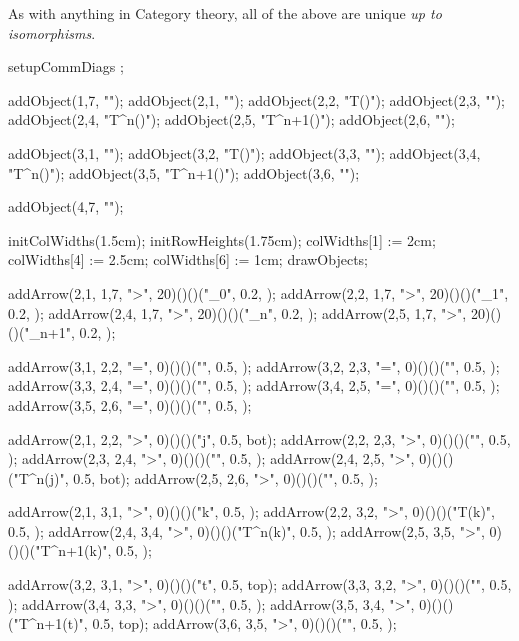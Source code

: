 \stopitemize

\noindent As with anything in Category theory, all of the above are unique 
\emph{up to isomorphisms}. 

\item {} 

\stopitemize
\placeformula[left]\startformula {}
  setupCommDiags ; 
  
  addObject(1,7, "\wflol");
  addObject(2,1, "\emptySet");
  addObject(2,2, "T(\emptySet)");
  addObject(2,3, "\cdots");
  addObject(2,4, "T^n(\emptySet)");
  addObject(2,5, "T^{n+1}(\emptySet)");
  addObject(2,6, "\cdots");
  
  addObject(3,1, "");
  addObject(3,2, "T()");
  addObject(3,3, "\cdots");
  addObject(3,4, "T^n()");
  addObject(3,5, "T^{n+1}()");
  addObject(3,6, "\cdots");
  
  addObject(4,7, "\lol");

  initColWidths(1.5cm);
  initRowHeights(1.75cm);
  colWidths[1] := 2cm;
  colWidths[4] := 2.5cm;
  colWidths[6] := 1cm;
  drawObjects;

  addArrow(2,1, 1,7, ">", 20)()()("_0",     0.2, );
  addArrow(2,2, 1,7, ">", 20)()()("_1",     0.2, );
  addArrow(2,4, 1,7, ">", 20)()()("_n",     0.2, );
  addArrow(2,5, 1,7, ">", 20)()()("_{n+1}", 0.2, );
  
  addArrow(3,1, 2,2, "=", 0)()()("",           0.5, );
  addArrow(3,2, 2,3, "=", 0)()()("",           0.5, );
  addArrow(3,3, 2,4, "=", 0)()()("",           0.5, );
  addArrow(3,4, 2,5, "=", 0)()()("",           0.5, );
  addArrow(3,5, 2,6, "=", 0)()()("",           0.5, );

  addArrow(2,1, 2,2, ">", 0)()()("j",          0.5, bot);
  addArrow(2,2, 2,3, ">", 0)()()("",           0.5, );
  addArrow(2,3, 2,4, ">", 0)()()("",           0.5, );
  addArrow(2,4, 2,5, ">", 0)()()("T^n(j)",     0.5, bot);
  addArrow(2,5, 2,6, ">", 0)()()("",           0.5, );

  addArrow(2,1, 3,1, ">", 0)()()("k",          0.5, );
  addArrow(2,2, 3,2, ">", 0)()()("T(k)",       0.5, );
  addArrow(2,4, 3,4, ">", 0)()()("T^n(k)",     0.5, );
  addArrow(2,5, 3,5, ">", 0)()()("T^{n+1}(k)", 0.5, );

  addArrow(3,2, 3,1, ">", 0)()()("t",          0.5, top);
  addArrow(3,3, 3,2, ">", 0)()()("",           0.5, );
  addArrow(3,4, 3,3, ">", 0)()()("",           0.5, );
  addArrow(3,5, 3,4, ">", 0)()()("T^{n+1}(t)", 0.5, top);
  addArrow(3,6, 3,5, ">", 0)()()("",           0.5, );

